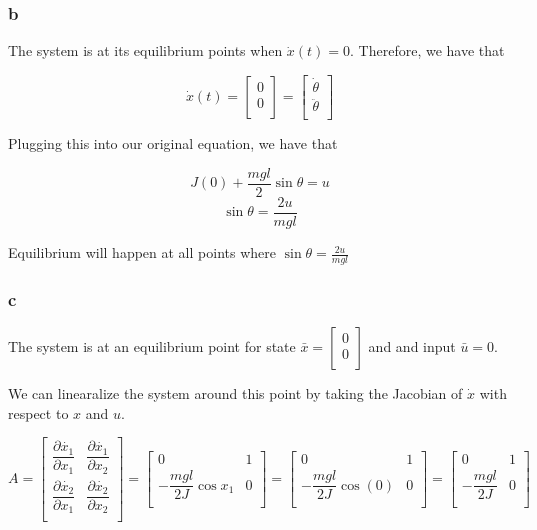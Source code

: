 \documentclass[11pt]{article}
\begin{document}
\subsubsection{b}

The system is at its equilibrium points when $\dot{x}(t) = 0$. Therefore, we have that 

\[
\dot{x}(t) = 
\begin{bmatrix}
    0 \\
    0 \\
\end{bmatrix}
=
\begin{bmatrix}
    \dot{\theta} \\
    \ddot{\theta} \\
\end{bmatrix}
\]

Plugging this into our original equation, we have that

\[ J (0) + \dfrac{mgl}{2} \sin \theta = u \]
\[\sin\theta = \dfrac{2u}{mgl} \]

Equilibrium will happen at all points where $\sin \theta = \frac{2u}{mgl}$

\subsubsection{c}

The system is at an equilibrium point for state $\bar{x} = \begin{bmatrix} 0 \\ 0 \\ \end{bmatrix}$ and and input $\bar{u} = 0$.

We can linearalize the system around this point by taking the Jacobian of $\dot{x}$ with respect to $x$ and $u$.

\[
    A = 
    \begin{bmatrix}
        \dfrac{\partial \dot{x_1}}{\partial x_1} & \dfrac{\partial \dot{x_1}}{\partial x_2} \\
        \dfrac{\partial \dot{x_2}}{\partial x_1} & \dfrac{\partial \dot{x_2}}{\partial x_2} \\
    \end{bmatrix}
    = \begin{bmatrix}
        0 & 1 \\
        - \dfrac{mgl}{2J} \cos x_1 & 0 \\
    \end{bmatrix}
    = \begin{bmatrix}
        0 & 1 \\
        - \dfrac{mgl}{2J} \cos (0) & 0 \\
    \end{bmatrix}
    = \begin{bmatrix}
        0 & 1 \\
        - \dfrac{mgl}{2J} & 0 \\
    \end{bmatrix}
\]
\end{document}
